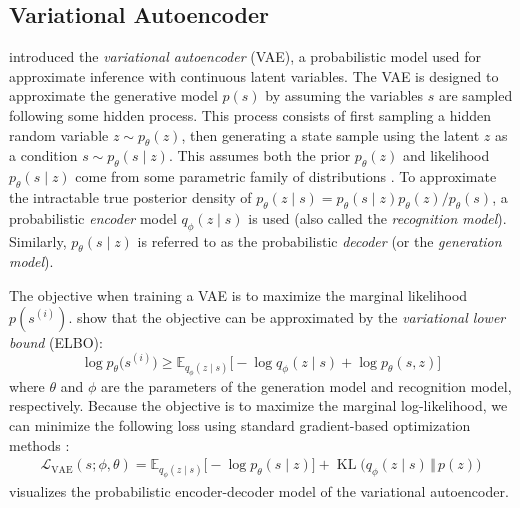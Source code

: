 \subsection{Variational Autoencoder}

\textcite{kingma2013vae} introduced the \textit{variational autoencoder} (VAE), a probabilistic model used for approximate inference with continuous latent variables.
The VAE is designed to approximate the generative model $p(s)$ by assuming the variables $s$ are sampled following some hidden process.
This process consists of first sampling a hidden random variable $z \sim p_\theta(z)$, then generating a state sample using the latent $z$ as a condition $s \sim p_\theta(s \mid z)$. 
This assumes both the prior $p_\theta(z)$ and likelihood $p_\theta(s \mid z)$ come from some parametric family of distributions \cite{kingma2013vae}.
To approximate the intractable true posterior density of $p_\theta(z \mid s) = p_\theta(s \mid z)p_\theta(z) / p_\theta(s)$, a probabilistic \textit{encoder} model $q_\phi(z \mid s)$ is used (also called the \textit{recognition model}).
Similarly, $p_\theta(s \mid z)$ is referred to as the probabilistic \textit{decoder} (or the \textit{generation model}).

The objective when training a VAE is to maximize the marginal likelihood $p(s^{(i)})$.
\textcite{kingma2013vae} show that the objective can be approximated by the \textit{variational lower bound} (ELBO):
\begin{equation}
    \log p_\theta\big(s^{(i)}\big) \ge \mathbb{E}_{q_\phi(z \mid s)} \big[-\log q_\phi(z \mid s) + \log p_\theta(s, z)\big]
\end{equation}
where $\theta$ and $\phi$ are the parameters of the generation model and recognition model, respectively.
Because the objective is to maximize the marginal log-likelihood, we can minimize the following loss using standard gradient-based optimization methods \cite{kingma2014adam}:
\begin{align}
    \mathcal{L}_\text{VAE}(s; \phi, \theta) = \displaystyle \mathbb{E}_{q_\phi(z \mid s)} \big[ -\log p_\theta(s \mid z) \big] + \operatorname{KL}\!\big(q_\phi(z \mid s) \,\Vert\, p(z)\big)
\end{align}
 visualizes the probabilistic encoder-decoder model of the variational autoencoder.

